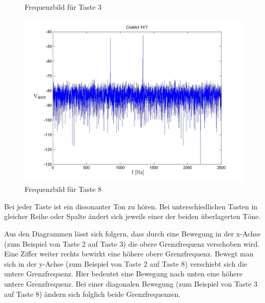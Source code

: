 \documentclass[10pt]{scrreprt}
\begin{document}
\begin{center}
\begin{figure}[H]
                \caption{Frequenzbild für Taste 3}
            \end{figure}
            \begin{figure}[H]
                \includegraphics[width=\textwidth]{Screenshot_GUI_431_T8_chan1_fft.jpg}
                \caption{Frequenzbild für Taste 8}
            \end{figure}
        \end{center}
        Bei jeder Taste ist ein dissonanter Ton zu hören. Bei unterschiedlichen Tasten
        in gleicher Reihe oder Spalte ändert sich jeweils einer der beiden überlagerten
        Töne.

        Aus den Diagrammen lässt sich folgern, dass durch eine Bewegung in der x-Achse
        (zum Beispiel von Taste 2 auf Taste 3) die obere Grenzfrequenz verschoben wird. Eine Ziffer weiter
        rechts bewirkt eine höhere obere Grenzfrequenz.
        Bewegt man sich in der y-Achse (zum Beispiel von Taste 2 auf Taste 8)
        verschiebt sich die untere Grenzfrequenz. Hier bedeutet eine Bewegung
        nach unten eine höhere untere Grenzfrequenz.
        Bei einer diagonalen Bewegung (zum Beispiel von Taste 3 auf Taste 8) ändern
        sich folglich beide Grenzfrequenzen.
\end{document}
